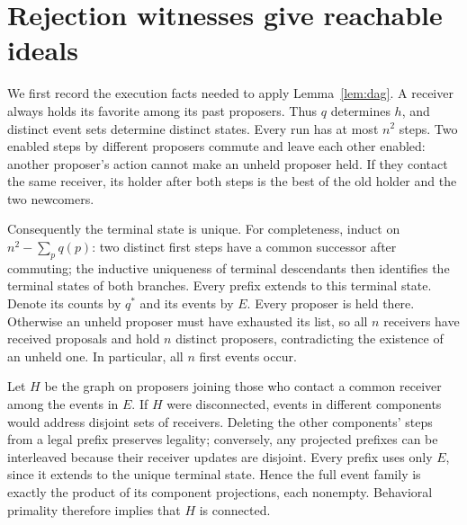 \documentclass[11pt]{article}
\begin{document}
\section{Rejection witnesses give reachable ideals}

We first record the execution facts needed to apply
Lemma~\ref{lem:dag}. A receiver always holds its favorite among its past
proposers. Thus $q$ determines $h$, and distinct event sets determine
distinct states. Every run has at most $n^2$ steps. Two enabled steps by
different proposers commute and leave each other enabled: another
proposer's action cannot make an unheld proposer held. If they contact
the same receiver, its holder after both steps is the best of the old
holder and the two newcomers.

Consequently the terminal state is unique. For completeness, induct on
$n^2-\sum_p q(p)$: two distinct first steps have a common successor after
commuting; the inductive uniqueness of terminal descendants then
identifies the terminal states of both branches. Every prefix extends to
this terminal state. Denote its counts by $q^*$ and its events by $E$.
Every proposer is held there. Otherwise an unheld proposer must have
exhausted its list, so all $n$ receivers have received proposals and hold
$n$ distinct proposers, contradicting the existence of an unheld one.
In particular, all $n$ first events occur.

Let $H$ be the graph on proposers joining those who contact a common
receiver among the events in $E$. If $H$ were disconnected, events in
different components would address disjoint sets of receivers. Deleting
the other components' steps from a legal prefix preserves legality;
conversely, any projected prefixes can be interleaved because their
receiver updates are disjoint. Every prefix uses only $E$, since it
extends to the unique terminal state. Hence the full event family is
exactly the product of its component projections, each nonempty.
Behavioral primality therefore implies that $H$ is connected.
\end{document}
